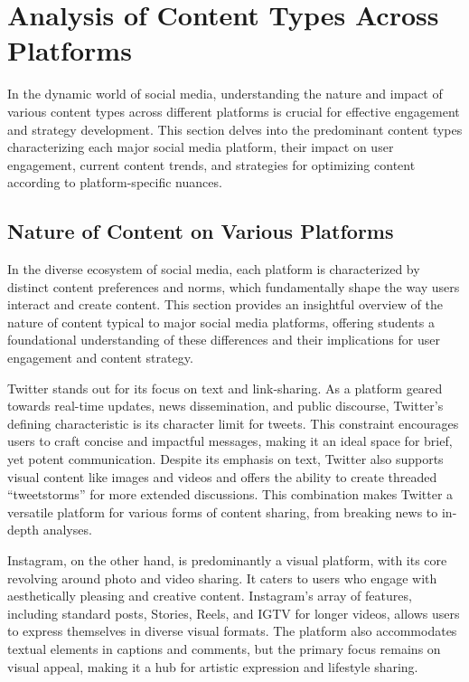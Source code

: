 \documentclass[
]{book}
\begin{document}
\hypertarget{analysis-of-content-types-across-platforms}{%
\section*{Analysis of Content Types Across Platforms}\label{analysis-of-content-types-across-platforms}}

In the dynamic world of social media, understanding the nature and impact of various content types across different platforms is crucial for effective engagement and strategy development. This section delves into the predominant content types characterizing each major social media platform, their impact on user engagement, current content trends, and strategies for optimizing content according to platform-specific nuances.

\hypertarget{nature-of-content-on-various-platforms}{%
\subsection*{Nature of Content on Various Platforms}\label{nature-of-content-on-various-platforms}}

In the diverse ecosystem of social media, each platform is characterized by distinct content preferences and norms, which fundamentally shape the way users interact and create content. This section provides an insightful overview of the nature of content typical to major social media platforms, offering students a foundational understanding of these differences and their implications for user engagement and content strategy.

Twitter stands out for its focus on text and link-sharing. As a platform geared towards real-time updates, news dissemination, and public discourse, Twitter's defining characteristic is its character limit for tweets. This constraint encourages users to craft concise and impactful messages, making it an ideal space for brief, yet potent communication. Despite its emphasis on text, Twitter also supports visual content like images and videos and offers the ability to create threaded ``tweetstorms'' for more extended discussions. This combination makes Twitter a versatile platform for various forms of content sharing, from breaking news to in-depth analyses.

Instagram, on the other hand, is predominantly a visual platform, with its core revolving around photo and video sharing. It caters to users who engage with aesthetically pleasing and creative content. Instagram's array of features, including standard posts, Stories, Reels, and IGTV for longer videos, allows users to express themselves in diverse visual formats. The platform also accommodates textual elements in captions and comments, but the primary focus remains on visual appeal, making it a hub for artistic expression and lifestyle sharing.
\end{document}
